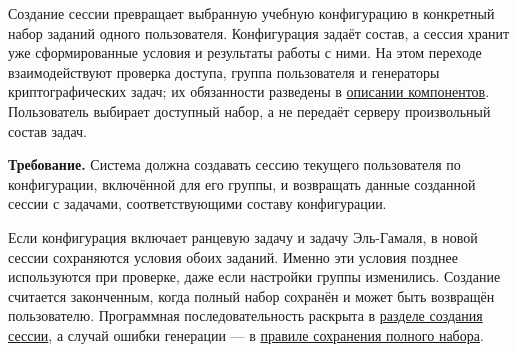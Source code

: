 \documentclass[12pt,a4paper]{article}
\begin{document}
\hypertarget{sr-ses-001-создание-набора-по-конфигурации-группы}{}

Создание сессии превращает выбранную учебную конфигурацию в конкретный набор заданий одного пользователя. Конфигурация задаёт состав, а сессия хранит уже сформированные условия и результаты работы с ними. На этом переходе взаимодействуют проверка доступа, группа пользователя и генераторы криптографических задач; их обязанности разведены в \href{../07_\%D0\%9F\%D1\%80\%D0\%BE\%D0\%B3\%D1\%80\%D0\%B0\%D0\%BC\%D0\%BC\%D0\%BD\%D1\%8B\%D0\%B5_\%D1\%82\%D1\%80\%D0\%B5\%D0\%B1\%D0\%BE\%D0\%B2\%D0\%B0\%D0\%BD\%D0\%B8\%D1\%8F/DOC-06_\%D0\%9F\%D1\%80\%D0\%BE\%D0\%B3\%D1\%80\%D0\%B0\%D0\%BC\%D0\%BC\%D0\%BD\%D1\%8B\%D0\%B5_\%D1\%82\%D1\%80\%D0\%B5\%D0\%B1\%D0\%BE\%D0\%B2\%D0\%B0\%D0\%BD\%D0\%B8\%D1\%8F.pdf\#nameddest=2-\%D0\%BE\%D1\%82\%D0\%B2\%D0\%B5\%D1\%82\%D1\%81\%D1\%82\%D0\%B2\%D0\%B5\%D0\%BD\%D0\%BD\%D0\%BE\%D1\%81\%D1\%82\%D1\%8C-\%D0\%B8-\%D1\%81\%D0\%B2\%D1\%8F\%D0\%B7\%D0\%B8}{описании компонентов}. Пользователь выбирает доступный набор, а не передаёт серверу произвольный состав задач.

\textbf{Требование.} Система должна создавать сессию текущего пользователя по конфигурации, включённой для его группы, и возвращать данные созданной сессии с задачами, соответствующими составу конфигурации.

Если конфигурация включает ранцевую задачу и задачу Эль-Гамаля, в новой сессии сохраняются условия обоих заданий. Именно эти условия позднее используются при проверке, даже если настройки группы изменились. Создание считается законченным, когда полный набор сохранён и может быть возвращён пользователю. Программная последовательность раскрыта в \href{../07_\%D0\%9F\%D1\%80\%D0\%BE\%D0\%B3\%D1\%80\%D0\%B0\%D0\%BC\%D0\%BC\%D0\%BD\%D1\%8B\%D0\%B5_\%D1\%82\%D1\%80\%D0\%B5\%D0\%B1\%D0\%BE\%D0\%B2\%D0\%B0\%D0\%BD\%D0\%B8\%D1\%8F/DOC-06.2_\%D0\%A1\%D0\%B5\%D1\%81\%D1\%81\%D0\%B8\%D0\%B8_\%D0\%B7\%D0\%B0\%D0\%B4\%D0\%B0\%D1\%87_\%D0\%B8_\%D0\%BF\%D0\%BB\%D0\%B0\%D0\%BD\%D0\%B8\%D1\%80\%D0\%BE\%D0\%B2\%D1\%89\%D0\%B8\%D0\%BA.pdf\#nameddest=2-\%D1\%81\%D0\%BE\%D0\%B7\%D0\%B4\%D0\%B0\%D0\%BD\%D0\%B8\%D0\%B5-\%D1\%81\%D0\%B5\%D1\%81\%D1\%81\%D0\%B8\%D0\%B8}{разделе создания сессии}, а случай ошибки генерации --- в \href{../07_\%D0\%9F\%D1\%80\%D0\%BE\%D0\%B3\%D1\%80\%D0\%B0\%D0\%BC\%D0\%BC\%D0\%BD\%D1\%8B\%D0\%B5_\%D1\%82\%D1\%80\%D0\%B5\%D0\%B1\%D0\%BE\%D0\%B2\%D0\%B0\%D0\%BD\%D0\%B8\%D1\%8F/DOC-06.2_\%D0\%A1\%D0\%B5\%D1\%81\%D1\%81\%D0\%B8\%D0\%B8_\%D0\%B7\%D0\%B0\%D0\%B4\%D0\%B0\%D1\%87_\%D0\%B8_\%D0\%BF\%D0\%BB\%D0\%B0\%D0\%BD\%D0\%B8\%D1\%80\%D0\%BE\%D0\%B2\%D1\%89\%D0\%B8\%D0\%BA.pdf\#nameddest=swr-ses-005-\%D1\%81\%D0\%BE\%D1\%85\%D1\%80\%D0\%B0\%D0\%BD\%D0\%B5\%D0\%BD\%D0\%B8\%D0\%B5-\%D1\%81\%D0\%BE\%D0\%B7\%D0\%B4\%D0\%B0\%D0\%BD\%D0\%BD\%D0\%BE\%D0\%B3\%D0\%BE-\%D0\%BD\%D0\%B0\%D0\%B1\%D0\%BE\%D1\%80\%D0\%B0}{правиле сохранения полного набора}.
\end{document}
